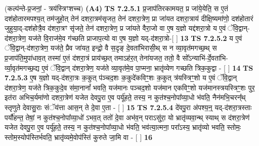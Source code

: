 \documentclass[17pt]{extarticle}
\begin{document}
                      (कल्प॑न्ते-प्र॒जनां॒ - त्रय॑स्त्रिꣳशच्च)  \textbf{(A4)} \newline \newline
                                        \textbf{ TS 7.2.5.1} \newline
                  प्र॒जाप॑तिरकामयत॒ प्र जा॑ये॒येति॒ स ए॒तं दश॑होतारमपश्य॒त् तम॑जुहो॒त् तेन॑ दशरा॒त्रम॑सृजत॒ तेन॑ दशरा॒त्रेण॒ प्रा जा॑यत दशरा॒त्राय॑ दीक्षि॒ष्यमा॑णो॒ दश॑होतारं जुहुया॒द्-दश॑होत्रै॒व द॑शरा॒त्रꣳ सृ॑जते॒ तेन॑ दशरा॒त्रेण॒ प्र जा॑यते वैरा॒जो वा ए॒ष य॒ज्ञो यद्द॑शरा॒त्रो य ए॒वं ॅवि॒द्वान्-द॑शरा॒त्रेण॒ यज॑ते वि॒राज॑मे॒व ग॑च्छति प्राजाप॒त्यो वा ए॒ष य॒ज्ञो यद्-द॑शरा॒त्रो-[  ] \textbf{  13} \newline
                  \newline
                                \textbf{ TS 7.2.5.2} \newline
                  य ए॒वं ॅवि॒द्वान्-द॑शरा॒त्रेण॒ यज॑ते॒ प्रैव जा॑यत॒ इन्द्रो॒ वै स॒दृङ् दे॒वता॑भिरासी॒थ् स न व्या॒वृत॑मगच्छ॒थ् स प्र॒जाप॑ति॒मुपा॑धाव॒त् तस्मा॑ ए॒तं द॑शरा॒त्रं प्राय॑च्छ॒त् तमाऽह॑र॒त् तेना॑यजत॒ ततो॒ वै सो᳚ऽन्याभि॑-र्दे॒वता॑भि-र्व्या॒वृत॑मगच्छ॒द्य ए॒वं ॅवि॒द्वान् द॑शरा॒त्रेण॒ यज॑ते व्या॒वृत॑मे॒व पा॒प्मना॒ भ्रातृ॑व्येण गच्छति त्रिक॒कुद्वा - [  ] \textbf{  14} \newline
                  \newline
                                \textbf{ TS 7.2.5.3} \newline
                  ए॒ष य॒ज्ञो यद्-द॑शरा॒त्रः क॒कुत् प॑ञ्चद॒शः क॒कुदे॑कविꣳ॒॒शः क॒कुत् त्र॑यस्त्रिꣳ॒॒शो य ए॒वं ॅवि॒द्वान् द॑शरा॒त्रेण॒ यज॑ते त्रिक॒कुदे॒व स॑मा॒नानां᳚ भवति॒ यज॑मानः पञ्चद॒शो यज॑मान एकविꣳ॒॒शो यज॑मानस्त्रयस्त्रिꣳ॒॒शः पुर॒ इत॑रा अभिच॒र्यमा॑णो दशरा॒त्रेण॑ यजेत देवपु॒रा ए॒व पर्यू॑हते॒ तस्य॒ न कुत॑श्च॒नोपा᳚व्या॒धो भ॑वति॒ नैन॑मभि॒चरन्᳚थ् स्तृणुते देवासु॒राः संॅय॑त्ता आस॒न् ते दे॒वा ए॒ता - [  ] \textbf{  15} \newline
                  \newline
                                \textbf{ TS 7.2.5.4} \newline
                  दे॑वपु॒रा अ॑पश्य॒न्॒ यद्-द॑शरा॒त्रस्ताः पर्यौ॑हन्त॒ तेषां॒ न कुत॑श्च॒नोपा᳚व्या॒धो॑ ऽभव॒त् ततो॑ दे॒वा अभ॑व॒न् पराऽसु॑रा॒ यो भ्रातृ॑व्यवा॒न्थ् स्याथ् स द॑शरा॒त्रेण॑ यजेत देवपु॒रा ए॒व पर्यू॑हते॒ तस्य॒ न कुत॑श्च॒नोपा᳚व्या॒धो भ॑वति॒ भव॑त्या॒त्मना॒ परा᳚ऽस्य॒ भ्रातृ॑व्यो भवति॒ स्तोमः॒ स्तोम॒स्योप॑स्तिर्भवति॒ भ्रातृ॑व्यमे॒वोप॑स्तिं कुरुते जा॒मि वा - [  ] \textbf{  16} \newline
                  \newline
\end{document}
